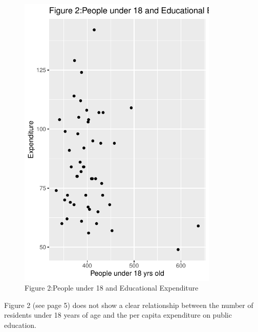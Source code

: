 \documentclass[12pt,letterpaper]{article}
\begin{document}
\begin{itemize}
		  
		\vspace{.5cm}
		\begin{figure}\centering
			\caption{Figure 2:People under 18 and Educational Expenditure}
			\includegraphics[width=0.85\textwidth]{Rplot2.pdf}
		\end{figure}
		Figure 2 (see page 5) does not show a clear relationship between the number of residents under 18 years of age and the per capita expenditure on public education.
		\vspace{.5cm}
		

\end{itemize}
\end{document}
